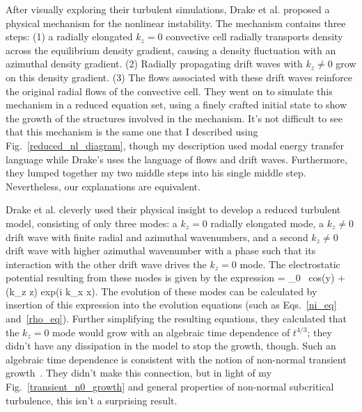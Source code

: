 After visually exploring their turbulent simulations, Drake et al. proposed a physical mechanism for the nonlinear instability. The mechanism contains three steps: (1) a radially elongated $k_z = 0$
convective cell radially transports density across the equilibrium density gradient, causing a density fluctuation with an azimuthal density gradient. (2) Radially propagating 
drift waves with $k_z \ne 0$ grow on this density gradient. (3) The flows associated with these drift waves reinforce the original radial flows of the convective cell. They went on to simulate
this mechanism in a reduced equation set, using a finely crafted initial state to show the growth of the structures involved in the mechanism. It's not difficult to see that this mechanism
is the same one that I described using Fig.~\ref{reduced_nl_diagram}, though my description used modal energy transfer language while Drake's uses the language of flows and drift waves.
Furthermore, they lumped together my two middle steps into his single middle step. Nevertheless, our explanations are equivalent.

Drake et al. cleverly used their physical insight to develop a reduced turbulent model, consisting of only three modes: a $k_z = 0$ radially elongated mode, a $k_z \ne 0$ drift wave with finite
radial and azimuthal wavenumbers, and a second $k_z \ne 0$ drift wave with higher azimuthal wavenumber with a phase such that its interaction with the other drift wave drives the $k_z = 0$
mode. The electrostatic potential resulting from these modes is given by the expression
\beq
\label{drake_potential}
\phi = \phi_0 \ {\rm cos}(\pi y) +  (k_z z) {\rm exp}(i k_x x).
\eeq
The evolution of these modes can be calculated by insertion of this expression into the evolution equations (such as Eqs.~\ref{ni_eq} and~\ref{rho_eq}). Further simplifying the resulting equations, 
they calculated that the $k_z = 0$ mode would grow with an algebraic time dependence of $t^{4/3}$; they didn't have any dissipation in the model to stop the growth, though. Such an algebraic time
dependence is consistent with the notion of non-normal transient growth~\cite{waleffe1995}. They didn't make this connection, but in light of my Fig.~\ref{transient_n0_growth} and general
properties of non-normal subcritical turbulence, this isn't a surprising result.


